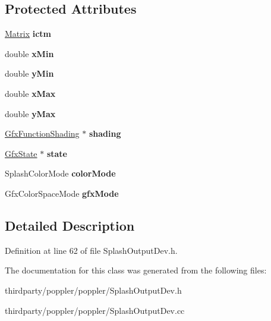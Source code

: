 \subsection*{Protected Attributes}
\begin{DoxyCompactItemize}
\item 
\mbox{\label{class_splash_function_pattern_ac0e8ba7b0617583aaee068dca50b1fce}} 
\hyperlink{class_matrix}{Matrix} {\bfseries ictm}
\item 
\mbox{\label{class_splash_function_pattern_a83735453341aa7a373b4877372d5f05a}} 
double {\bfseries x\+Min}
\item 
\mbox{\label{class_splash_function_pattern_afc078ae9662a3a575641db1556478ed2}} 
double {\bfseries y\+Min}
\item 
\mbox{\label{class_splash_function_pattern_a1b7b480bbf50e01b97b5588ab64e1bd1}} 
double {\bfseries x\+Max}
\item 
\mbox{\label{class_splash_function_pattern_aae0937ca8ac740c04cdb18d4e78a525c}} 
double {\bfseries y\+Max}
\item 
\mbox{\label{class_splash_function_pattern_a1a6bd157dc21f84f4710b0215221bfeb}} 
\hyperlink{class_gfx_function_shading}{Gfx\+Function\+Shading} $\ast$ {\bfseries shading}
\item 
\mbox{\label{class_splash_function_pattern_a3ddb678b59ee4632a254ebf7da4e02c3}} 
\hyperlink{class_gfx_state}{Gfx\+State} $\ast$ {\bfseries state}
\item 
\mbox{\label{class_splash_function_pattern_a8241357d02f882c135285b1caeb8ee30}} 
Splash\+Color\+Mode {\bfseries color\+Mode}
\item 
\mbox{\label{class_splash_function_pattern_adb446fe475c49205323ed2e5dc57acfd}} 
Gfx\+Color\+Space\+Mode {\bfseries gfx\+Mode}
\end{DoxyCompactItemize}


\subsection{Detailed Description}


Definition at line 62 of file Splash\+Output\+Dev.\+h.



The documentation for this class was generated from the following files\+:\begin{DoxyCompactItemize}
\item 
thirdparty/poppler/poppler/Splash\+Output\+Dev.\+h\item 
thirdparty/poppler/poppler/Splash\+Output\+Dev.\+cc\end{DoxyCompactItemize}
